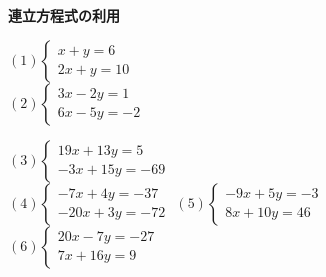 \documentclass[b4paper,16.5pt,paparesize, landscape]{ltjsarticle}%
\begin{document}
{\textbf{\Large{連立方程式の利用}}}\hspace{\fill}{\scalebox{1.5}{（　）組（　　　　　　　　）}}\\
\begin{multicols*}{3}
$(1)\begin{cases}
	x + y = 6\\ 2x + y = 10
\end{cases}$ 	\\[75mm]
$(2)\begin{cases}
	3x - 2y = 1\\ 6x -5y = -2
\end{cases}$\vfill\null\columnbreak

$(3)\begin{cases}
19x + 13y = 5\\ -3x + 15y = -69
\end{cases}$ 	\\[75mm]
$(4)\begin{cases}
	-7x + 4y = -37 \\ -20x + 3y  = -72
\end{cases}$
 \vfill\null\columnbreak
$(5)\begin{cases}
	-9x + 5y = -3 \\ 8x + 10y =46
\end{cases}$ 	\\[75mm]
$(6)\begin{cases}
	20x - 7y = -27\\ 7x + 16y =9
\end{cases}$



\end{multicols*}
\end{document}
